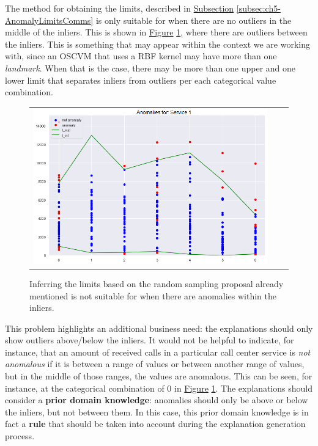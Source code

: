 The method for obtaining the limits, described in \hyperref[subsec:ch5-AnomalyLimitsComms]{Subsection} \ref{subsec:ch5-AnomalyLimitsComms} is only suitable for when there are no outliers in the middle of the inliers. This is shown in \hyperref[fig:ch5-anomaly-limit-problem]{Figure} \ref{fig:ch5-anomaly-limit-problem}, where there are outliers between the inliers. This is something that may appear within the context we are working with, since an OSCVM that uses a RBF kernel may have more than one \textit{landmark}. When that is the case, there may be more than one upper and one lower limit that separates inliers from outliers per each categorical value combination. 

\begin{figure}[h!]
\centering
  \begin{tabular}{c@{\qquad}c@{\qquad}c}
\includegraphics[width=0.70\columnwidth]{figures/chapter5_LucaComms/AnomalyLimits_example_problem.png}
  \end{tabular} 
  \caption{Inferring the limits based on the random sampling proposal already mentioned is not suitable for when there are anomalies within the inliers. \label{fig:ch5-anomaly-limit-problem}}
\end{figure}

This problem highlights an additional business need: the explanations should only show outliers above/below the inliers. It would not be helpful to indicate, for instance, that an amount of received calls in a particular call center service is \textit{not anomalous} if it is between a range of values or between another range of values, but in the middle of those ranges, the values are anomalous. This can be seen, for instance, at the categorical combination of 0 in \hyperref[fig:ch5-anomaly-limit-problem]{Figure} \ref{fig:ch5-anomaly-limit-problem}. The explanations should consider a \textbf{prior domain knowledge}: anomalies should only be above or below the inliers, but not between them. In this case, this prior domain knowledge is in fact a \textbf{rule} that should be taken into account during the explanation generation process. 


